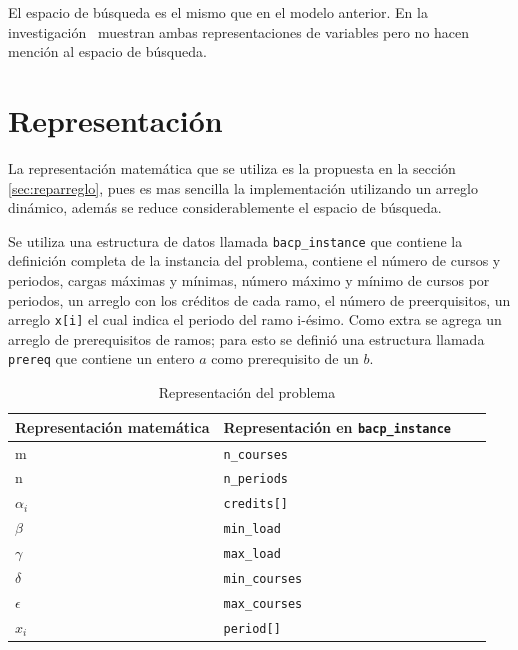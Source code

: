 \documentclass[letterpaper,10pt]{article}
\begin{document}
El espacio de búsqueda es el mismo que en el modelo anterior. En la investigación~\cite{Monette07acp} muestran ambas representaciones de variables pero no hacen mención al espacio de búsqueda.


\section{Representación}

La representación matemática que se utiliza es la propuesta en la sección \ref{sec:reparreglo}, pues es mas sencilla la implementación utilizando un arreglo dinámico, además se reduce considerablemente el espacio de búsqueda.

Se utiliza una estructura de datos llamada \texttt{bacp\_instance} que contiene la definición completa de la instancia del problema, contiene el número de cursos y periodos,  cargas máximas y mínimas, número máximo y mínimo de cursos por periodos, un arreglo con los créditos de cada ramo, el número de preerquisitos, un arreglo \texttt{x[i]} el cual indica el periodo del ramo i-ésimo. Como extra se agrega un arreglo de prerequisitos de ramos; para esto se definió una estructura llamada \texttt{prereq} que contiene un entero $a$ como prerequisito de un $b$.

\begin{table}[H]
  \centering
  \begin{tabular}{@{}lllc@{}}
    \toprule[1pt]
    Representación matemática & Representación en \texttt{bacp\_instance}\\
    \midrule
    m & \texttt{n\_courses}\\
    n & \texttt{n\_periods}\\
    $\alpha_i$ & \texttt{credits[]}\\
    $\beta$ & \texttt{min\_load}\\
    $\gamma$ & \texttt{max\_load}\\
    $\delta$ & \texttt{min\_courses}\\
    $\epsilon$ & \texttt{max\_courses}\\
    $x_i$ & \texttt{period[]}\\
    \bottomrule
  \end{tabular}
  \caption{Representación del problema}
\end{table}
\end{document}
